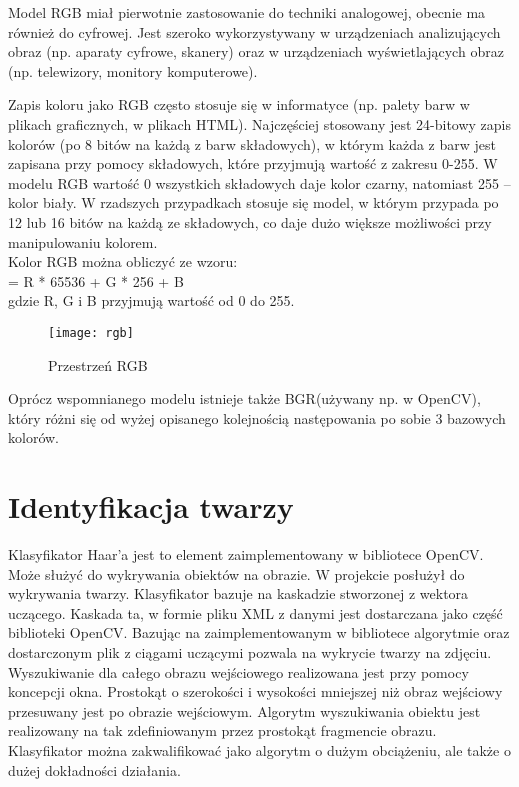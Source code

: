 \documentclass[eng,printmode]{mgr}
\begin{document}
Model RGB miał pierwotnie zastosowanie do techniki analogowej, obecnie ma również do cyfrowej. Jest szeroko wykorzystywany w urządzeniach analizujących obraz (np. aparaty cyfrowe, skanery) oraz w urządzeniach wyświetlających obraz (np. telewizory, monitory komputerowe).

Zapis koloru jako RGB często stosuje się w informatyce (np. palety barw w plikach graficznych, w plikach HTML). Najczęściej stosowany jest 24-bitowy zapis kolorów (po 8 bitów na każdą z barw składowych), w którym każda z barw jest zapisana przy pomocy składowych, które przyjmują wartość z zakresu 0-255. W modelu RGB wartość 0 wszystkich składowych daje kolor czarny, natomiast 255 – kolor biały. W rzadszych przypadkach stosuje się model, w którym przypada po 12 lub 16 bitów na każdą ze składowych, co daje dużo większe możliwości przy manipulowaniu kolorem\cite{wikirgb}. \\
Kolor RGB można obliczyć ze wzoru:
\\
 = R * 65536 + G * 256 + B\\
gdzie R, G i B przyjmują wartość od 0 do 255.\\

\begin{figure}[placement h]
\texttt{[image: rgb]}
\caption{Przestrzeń RGB}
\end{figure}

Oprócz wspomnianego modelu istnieje także BGR(używany np. w OpenCV), który różni się od wyżej opisanego kolejnością następowania po sobie 3 bazowych kolorów.
\section{Identyfikacja twarzy}

Klasyfikator Haar'a jest to element zaimplementowany w bibliotece OpenCV. Może służyć do wykrywania obiektów na obrazie. W projekcie posłużył do wykrywania twarzy. Klasyfikator bazuje na kaskadzie stworzonej z wektora uczącego. Kaskada ta, w formie pliku XML z danymi jest dostarczana jako część biblioteki OpenCV. Bazując na zaimplementowanym w bibliotece algorytmie oraz dostarczonym plik z ciągami uczącymi pozwala na wykrycie twarzy na zdjęciu. Wyszukiwanie dla całego obrazu wejściowego realizowana jest przy pomocy koncepcji okna. Prostokąt o szerokości i wysokości mniejszej niż obraz wejściowy przesuwany jest po obrazie wejściowym. Algorytm wyszukiwania obiektu jest realizowany na tak zdefiniowanym przez prostokąt fragmencie obrazu. Klasyfikator można zakwalifikować jako algorytm o dużym obciążeniu, ale także o dużej dokładności działania.
\end{document}
